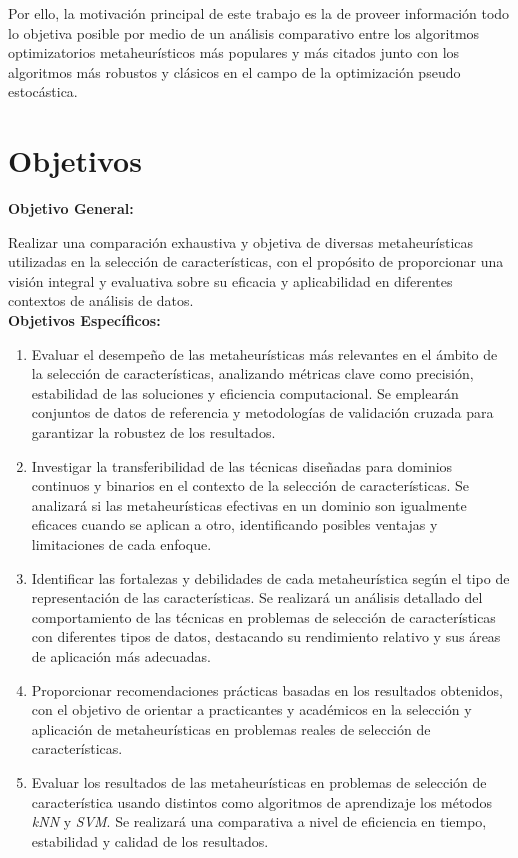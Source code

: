 Por ello, la motivación principal de este trabajo es la de proveer información todo lo objetiva posible por medio de un análisis comparativo entre los
algoritmos optimizatorios metaheurísticos más populares y más citados junto con los
algoritmos más robustos y clásicos en el campo de la optimización pseudo estocástica.

\section{Objetivos}
\textbf{Objetivo General:}

Realizar una comparación exhaustiva y objetiva de diversas metaheurísticas utilizadas en la
selección de características, con el propósito de proporcionar una visión integral y
evaluativa sobre su eficacia y aplicabilidad en diferentes contextos de análisis de
datos.\\[6pt]
\textbf{Objetivos Específicos:}

\begin{enumerate}
      \item Evaluar el desempeño de las metaheurísticas más relevantes en el ámbito de la
            selección de características, analizando métricas clave como precisión, estabilidad de
            las soluciones y eficiencia computacional. Se emplearán conjuntos de datos de referencia
            y metodologías de validación cruzada para garantizar la robustez de los resultados.

      \item Investigar la transferibilidad de las técnicas diseñadas para dominios continuos y
            binarios en el contexto de la selección de características. Se analizará si las
            metaheurísticas efectivas en un dominio son igualmente eficaces cuando se aplican a
            otro, identificando posibles ventajas y limitaciones de cada enfoque.

      \item Identificar las fortalezas y debilidades de cada metaheurística según el tipo de
            representación de las características. Se realizará un análisis detallado del
            comportamiento de las técnicas en problemas de selección de características con
            diferentes tipos de datos, destacando su rendimiento relativo y sus áreas de aplicación
            más adecuadas.

      \item Proporcionar recomendaciones prácticas basadas en los resultados obtenidos, con el
            objetivo de orientar a practicantes y académicos en la selección y aplicación de
            metaheurísticas en problemas reales de selección de características.

      \item Evaluar los resultados de las metaheurísticas en problemas de selección de característica
            usando distintos como algoritmos de aprendizaje los métodos \textit{kNN} y \textit{SVM}. Se realizará
            una comparativa a nivel de eficiencia en tiempo, estabilidad y calidad de los resultados.
\end{enumerate}
